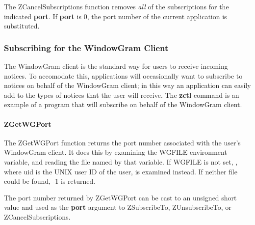 \etemplate
{}

The ZCancelSubscriptions function removes {\em all\/} of the
subscriptions for the indicated {\bf port}.  If {\bf port} is 0, the
port number of the current application is substituted.

\subsubsection{Subscribing for the WindowGram Client}
\label{subscribing-zwgc}

The WindowGram client is the standard way for users to receive incoming
notices.  To accomodate this, applications will occasionally want to
subscribe to notices on behalf of the WindowGram client; in this way an
application can easily add to the types of notices that the user will
receive.  The {\bf zctl} command is an example of a program that will
subscribe on behalf of the WindowGram client.

\paragraph{ZGetWGPort}
\label{ZGetWGPort}

\etemplate
{}

The ZGetWGPort function returns the port number associated with the
user's WindowGram client.  It does this by examining the WGFILE
environment variable, and reading the file named by that variable.
If WGFILE is not set, , where uid is the
UNIX user ID of the user, is examined instead.  If neither file could be
found, -1 is returned.

The port number returned by ZGetWGPort can be cast to an unsigned short
value and used as the {\bf port} argument to ZSubscribeTo,
ZUnsubscribeTo, or ZCancelSubscriptions.
